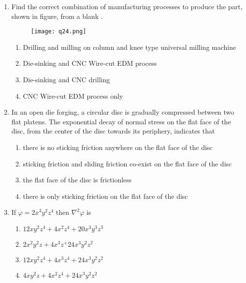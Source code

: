 \documentclass[journal,12pt,onecolumn]{IEEEtran}
\theoremstyle{remark}
\begin{document}
\begin{enumerate}
    \item Find the correct combination of manufacturing processes to produce the part, shown in figure, from a blank .
    
    \begin{figure}[H]
        \centering
        \texttt{[image: q24.png]}
        \caption*{}
        \label{fig:q24}
    \end{figure}
    
    \hfill{}
    \begin{enumerate}
        \item Drilling and milling on column and knee type universal milling machine
        \item Die-sinking and CNC Wire-cut EDM process
        \item Die-sinking and CNC drilling
        \item CNC Wire-cut EDM process only
    \end{enumerate}

    \item In an open die forging, a circular disc is gradually compressed between two flat platens. The exponential decay of normal stress on the flat face of the disc, from the center of the disc towards its periphery, indicates that
    
    \hfill{}
    \begin{enumerate}
        \item there is no sticking friction anywhere on the flat face of the disc
        \item sticking friction and sliding friction co-exist on the flat face of the disc
        \item the flat face of the disc is frictionless
        \item there is only sticking friction on the flat face of the disc
    \end{enumerate}

    \item If $\varphi = 2x^3y^2z^4$ then $\nabla^2\varphi$ is 

    \hfill{}

    \begin{enumerate}
    \item $12xy^2z^4 + 4x^2z^4 + 20x^3y^3z^3$
    \item $2x^2y^2z + 4x^3z^ + 24x^3y^2z^2$
    \item $12xy^2z^4 + 4x^3z^4 + 24x^3y^2z^2$
    \item $4xy^2z + 4x^2z^4 + 24x^3y^2z^2$
    \end{enumerate}


\end{enumerate}
\end{document}

